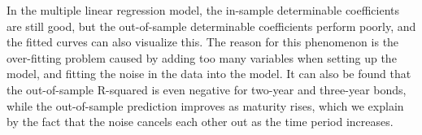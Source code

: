 \documentclass[12pt]{article}
\begin{document}
In the multiple linear regression model, the in-sample determinable coefficients are still good, but the out-of-sample determinable coefficients perform poorly, and the fitted curves can also visualize this. The reason for this phenomenon is the over-fitting problem caused by adding too many variables when setting up the model, and fitting the noise in the data into the model. It can also be found that the out-of-sample R-squared is even negative for two-year and three-year bonds, while the out-of-sample prediction improves as maturity rises, which we explain by the fact that the noise cancels each other out as the time period increases.

\begin{table}[htp!]
    \centering
    \caption{OLS: Result of Robustness Check}
\end{table}
\end{document}
